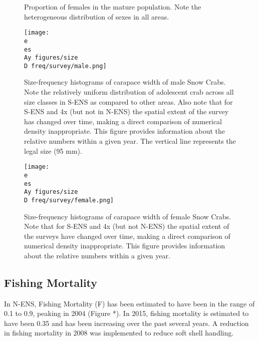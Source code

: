 \documentclass[paper=a4, fontsize=11pt]{article}
\newcommand{\D}{.}
\newcommand{\e}{\string~/ecomod_data/}
\newcommand{\es}{snowcrab/}
\newcommand{\Ay}{assessments/2015/}
\begin{document}
\begin{figure}[h]
  \centering
  \caption{Proportion of females in the mature population. Note the heterogeneous distribution of sexes in all areas.}
\end{figure}
\clearpage


\begin{figure}[h]
    \centering
    \texttt{[image: \\e \\es \\Ay figures/size\\D freq/survey/male.png]}
    \caption{Size-frequency histograms of carapace width of male Snow Crabs. Note the relatively uniform distribution of adolescent crab across all size classes in S-ENS as compared to other areas. Also note that for S-ENS and 4x (but not in N-ENS) the spatial extent of the survey has changed over time, making a direct comparison of numerical density inappropriate. This figure provides information about the relative numbers within a given year. The vertical line represents the legal size (95 mm).}
\end{figure}


\begin{figure}[h]
    \centering
    \texttt{[image: \\e \\es \\Ay figures/size\\D freq/survey/female.png]}
    \caption{Size-frequency histograms of carapace width of female Snow Crabs. Note that for S-ENS and 4x (but not N-ENS) the spatial extent of the surveys have changed over time, making a direct comparison of numerical density inappropriate. This figure provides information about the relative numbers within a given year.}
\end{figure}
\clearpage

\subsection{Fishing Mortality}

In N-ENS, Fishing Mortality (F) has been estimated to have been in the range of 0.1 to 0.9, peaking in 2004 (Figure *). In 2015, fishing mortality is estimated to have been 0.35 and has been increasing over the past several years. A reduction in fishing mortality in 2008 was implemented to reduce soft shell handling.\\
\end{document}
